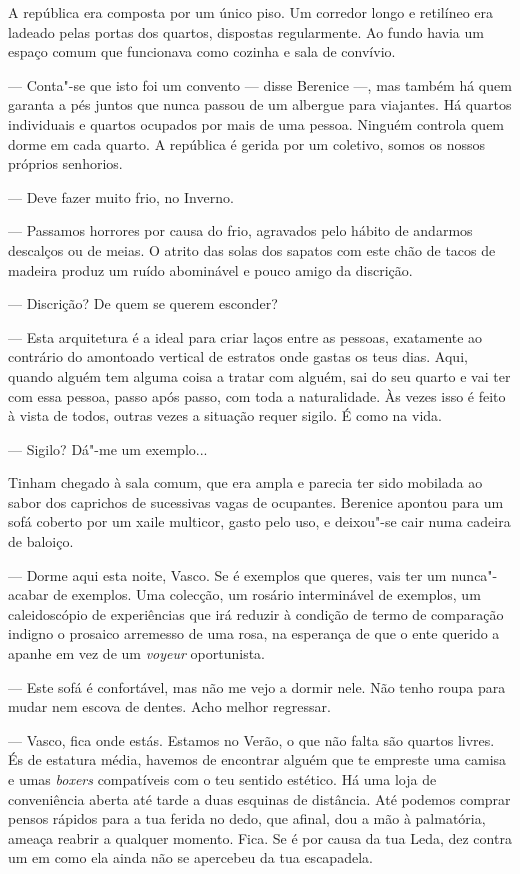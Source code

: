 A república era composta por um único piso. Um corredor longo e
retilíneo era ladeado pelas portas dos quartos, dispostas regularmente.
Ao fundo havia um espaço comum que funcionava como cozinha e sala de
convívio.

--- Conta"-se que isto foi um convento --- disse Berenice
---, mas também há quem garanta a pés juntos que nunca passou de um
albergue para viajantes. Há quartos individuais e quartos ocupados por
mais de uma pessoa. Ninguém controla quem dorme em cada quarto. A
república é gerida por um coletivo, somos os nossos próprios senhorios.

--- Deve fazer muito frio, no Inverno.

--- Passamos horrores por causa do frio, agravados pelo hábito de andarmos
  descalços ou de meias. O atrito das solas dos sapatos com este chão de
  tacos de madeira produz um ruído abominável e pouco amigo da
  discrição.

--- Discrição? De quem se querem esconder?

--- Esta arquitetura é a ideal para criar laços entre as pessoas,
  exatamente ao contrário do amontoado vertical de estratos onde gastas
  os teus dias. Aqui, quando alguém tem alguma coisa a tratar com
  alguém, sai do seu quarto e vai ter com essa pessoa, passo após passo,
  com toda a naturalidade. Às vezes isso é feito à vista de todos,
  outras vezes a situação requer sigilo. É como na vida.

--- Sigilo? Dá"-me um exemplo...

Tinham chegado à sala comum, que era ampla e parecia ter sido mobilada
ao sabor dos caprichos de sucessivas vagas de ocupantes. Berenice
apontou para um sofá coberto por um xaile multicor, gasto pelo uso, e
deixou"-se cair numa cadeira de baloiço.

--- Dorme aqui esta noite, Vasco. Se é exemplos que queres, vais ter um
  nunca"-acabar de exemplos. Uma colecção, um rosário interminável de
  exemplos, um caleidoscópio de experiências que irá reduzir à
  condição de termo de comparação indigno o prosaico arremesso de uma
  rosa, na esperança de que o ente querido a apanhe em vez de um
  \emph{voyeur }oportunista.

--- Este sofá é confortável, mas não me vejo a dormir nele. Não tenho
  roupa para mudar nem escova de dentes. Acho melhor regressar.

--- Vasco, fica onde estás. Estamos no Verão, o que não falta são quartos
  livres. És de estatura média, havemos de encontrar alguém que te
  empreste uma camisa e umas \emph{boxers }compatíveis com o teu sentido
  estético. Há uma loja de conveniência aberta até tarde a duas
  esquinas de distância. Até podemos comprar pensos rápidos para a tua
  ferida no dedo, que afinal, dou a mão à palmatória, ameaça reabrir a
  qualquer momento. Fica. Se é por causa da tua Leda, dez contra um em
  como ela ainda não se apercebeu da tua escapadela.

